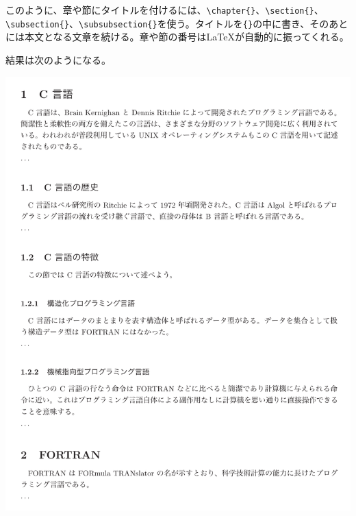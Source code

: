 このように、章や節にタイトルを付けるには、\verb|\chapter{}|、\verb|\section{}|、\verb|\subsection{}|、\verb|\subsubsection{}|を使う。タイトルを\verb|{}|の中に書き、そのあとには本文となる文章を続ける。章や節の番号は\LaTeX が自動的に振ってくれる。

結果は次のようになる。
\begin{kekka}
  \begin{center}
    \includegraphics[bb=0 0 453 569, width=.9\textwidth]{section.pdf}
  \end{center}
\end{kekka}


